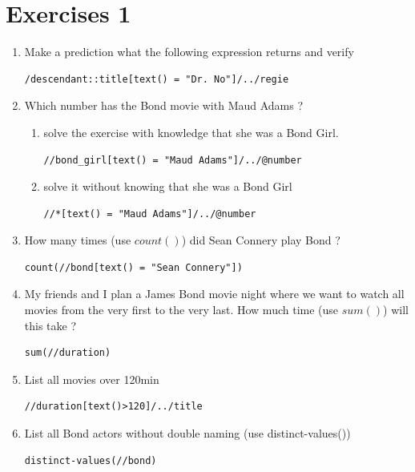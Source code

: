 \section{Exercises 1}
\begin{enumerate}
\item Make a prediction what the following expression returns and verify
\begin{lstlisting}[language=XML]
/descendant::title[text() = "Dr. No"]/../regie
\end{lstlisting}

\item Which number has the Bond movie with Maud Adams ?
\begin{enumerate}
\item solve the exercise with knowledge that she was a Bond Girl.
\begin{lstlisting}[language=XML]
//bond_girl[text() = "Maud Adams"]/../@number
\end{lstlisting}
\item solve it without knowing that she was a Bond Girl
\begin{lstlisting}[language=XML]
//*[text() = "Maud Adams"]/../@number
\end{lstlisting}
\end{enumerate}
\item How many times (use $count()$) did Sean Connery play Bond ?
\begin{lstlisting}[language=XML]
count(//bond[text() = "Sean Connery"])
\end{lstlisting}

\item My friends and I plan a James Bond movie night where we want to watch all movies from the very first to the very last.
How much time (use $sum()$) will this take ?
\begin{lstlisting}[language=XML]
sum(//duration)
\end{lstlisting}

\item List all movies over 120min
\begin{lstlisting}[language=XML]
//duration[text()>120]/../title
\end{lstlisting}

\item List all Bond actors without double naming (use distinct-values())
\begin{lstlisting}[language=XML]
distinct-values(//bond)
\end{lstlisting}
\end{enumerate}

